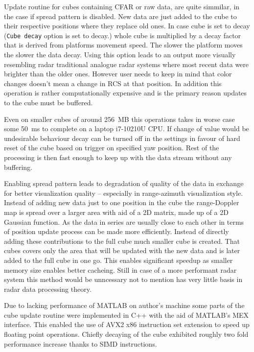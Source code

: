 Update routine for cubes containing CFAR or raw data, are quite simmilar, in the case if spread pattern is disabled.
New data are just added to the cube to their respective positions where they replace old ones.
In case cube is set to decay (\texttt{Cube decay} option is set to decay.) whole cube is multiplied by a decay factor that is derived from platforms movement speed.
The slower the platform moves the slower the data decay.
Using this option leads to an output more visually resembling radar  traditional analogue radar systems where most recent data were brighter than the older ones.
However user needs to keep in mind that color changes doesn't mean a change in RCS at that position.
In addition this operation is rather computationally expensive and is the primary reason updates to the cube must be buffered.

Even on smaller cubes of around 256~MB this operations takes in worse case some 50~ms to complete on a laptop i7-10210U CPU.
If change of value would be undesirable behaviour decay can be turned off in the settings in favour of hard reset of the cube based on trigger on specified yaw position.
Rest of the processing is then fast enough to keep up with the data stream without any buffering.

Enabling spread pattern leads to degradation of quality of the data in exchange for better visualization quality -- especially in range-azimuth visualization style.
Instead of adding new data just to one position in the cube the range-Doppler map is spread over a larger area with aid of a 2D matrix, made up of a 2D Gaussian function.
As the data in series are usually close to each other in terms of position update process can be made more efficiently.
Instead of directly adding these contributions to the full cube much smaller cube is created.
That cubes covers only the area that will be updated with the new data and is later added to the full cube in one go.
This enables significant speedup as smaller memory size enables better cacheing.
Still in case of a more performant radar system this method would be unncessary not to mention has very little basis in radar data processing theory.

Due to lacking performance of MATLAB on author's machine some parts of the cube update routine were implemented in C++ with the aid of MATLAB's MEX interface.
This enabled the use of AVX2 x86 instruction set extension to speed up floating point operations.
Chiefly decaying of the cube exhibited roughly two fold performance increase thanks to SIMD instructions.


